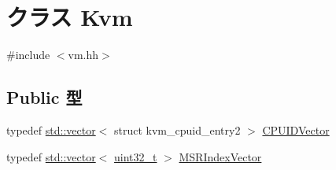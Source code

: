 \hypertarget{classKvm}{
\section{クラス Kvm}
\label{classKvm}
}


{\ttfamily \#include $<$vm.hh$>$}\subsection*{Public 型}
\begin{DoxyCompactItemize}
\item 
typedef \hyperlink{classstd_1_1vector}{std::vector}$<$ struct kvm\_\-cpuid\_\-entry2 $>$ \hyperlink{classKvm_af9d6fd6949b666ab0f41114891c201db}{CPUIDVector}
\item 
typedef \hyperlink{classstd_1_1vector}{std::vector}$<$ \hyperlink{Type_8hh_a435d1572bf3f880d55459d9805097f62}{uint32\_\-t} $>$ \hyperlink{classKvm_ab2ddfab51860a21d04f8ca0abe33a77f}{MSRIndexVector}
\end{DoxyCompactItemize}
